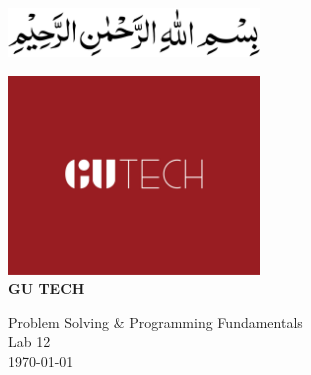 \documentclass[12pt]{article}
\begin{document}
\begin{titlepage}
    \centering

    \vspace*{-4em}
    \includegraphics[width=0.5\textwidth]{Bismillah.png}%
    \vspace*{5em}

    
    \vspace*{1cm}

     \includegraphics[width=0.5\textwidth]{GU Tech 1685x1330.png}\\[2cm]

    \MakeUppercase{\Huge \textbf{GU TECH}}\\[1.5ex]
    
    \vspace*{1cm}
    
    \Huge Problem Solving \& Programming Fundamentals \\[1.5ex]
    \LARGE Lab 12 \\[2cm]


    {\Large \today}\\[1cm]
    
\end{titlepage}

\newpage


\end{document}
